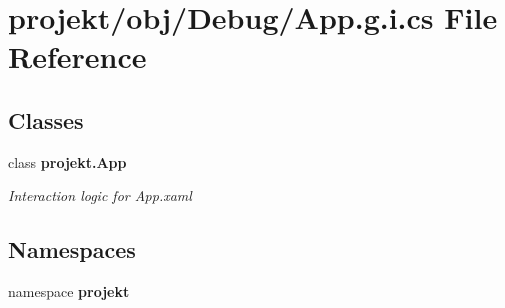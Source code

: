 \section{projekt/obj/\+Debug/\+App.g.\+i.\+cs File Reference}
\label{Debug_2App_8g_8i_8cs}
\subsection*{Classes}
\begin{DoxyCompactItemize}
\item 
class \textbf{ projekt.\+App}
\begin{DoxyCompactList}\small\item\em Interaction logic for App.\+xaml \end{DoxyCompactList}\end{DoxyCompactItemize}
\subsection*{Namespaces}
\begin{DoxyCompactItemize}
\item 
namespace \textbf{ projekt}
\end{DoxyCompactItemize}
